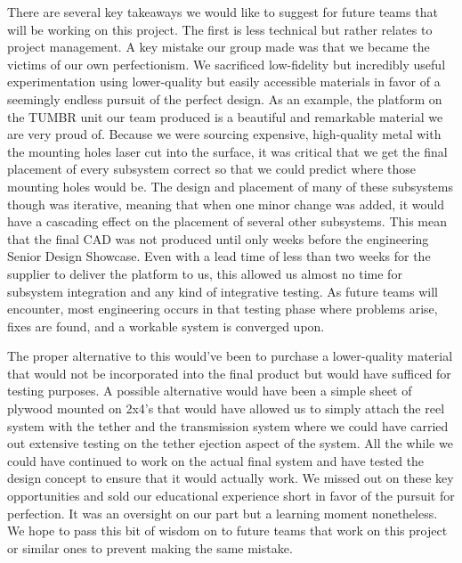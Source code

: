 \indent\indent There are several key takeaways we would like to suggest for future teams that will be working on this project. The first is less technical but rather relates to project management. A key mistake our group made was that we became the victims of our own perfectionism. We sacrificed low-fidelity but incredibly useful experimentation using lower-quality but easily accessible materials in favor of a seemingly endless pursuit of the perfect design. As an example, the platform on the TUMBR unit our team produced is a beautiful and remarkable material we are very proud of. Because we were sourcing expensive, high-quality metal with the mounting holes laser cut into the surface, it was critical that we get the final placement of every subsystem correct so that we could predict where those mounting holes would be. The design and placement of many of these subsystems though was iterative, meaning that when one minor change was added, it would have a cascading effect on the placement of several other subsystems. This mean that the final CAD was not produced until only weeks before the engineering Senior Design Showcase. Even with a lead time of less than two weeks for the supplier to deliver the platform to us, this allowed us almost no time for subsystem integration and any kind of integrative testing. As future teams will encounter, most engineering occurs in that testing phase where problems arise, fixes are found, and a workable system is converged upon. 

The proper alternative to this would've been to purchase a lower-quality material that would not be incorporated into the final product but would have sufficed for testing purposes. A possible alternative would have been a simple sheet of plywood mounted on 2x4's that would have allowed us to simply attach the reel system with the tether and the transmission system where we could have carried out extensive testing on the tether ejection aspect of the system. All the while we could have continued to work on the actual final system and have tested the design concept to ensure that it would actually work. We missed out on these key opportunities and sold our educational experience short in favor of the pursuit for perfection. It was an oversight on our part but a learning moment nonetheless. We hope to pass this bit of wisdom on to future teams that work on this project or similar ones to prevent making the same mistake. 

